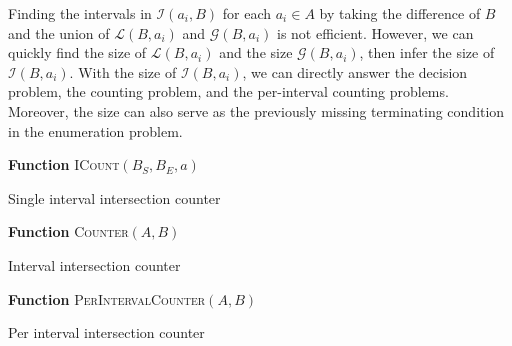 \documentclass{bioinfo}
\begin{document}
	Finding the intervals in $\mathcal{I}(a_i,B)$ for each $a_i\in A$ by
	taking the difference of $B$ and the union of $\mathcal{L}(B,a_i)$ and
	$\mathcal{G}(B,a_i)$ is not efficient.  However, we can quickly find
	the size of $\mathcal{L}(B,a_i)$ and the size $\mathcal{G}(B,a_i)$,
	then infer the size of $\mathcal{I}(B,a_i)$.  With the size of
	$\mathcal{I}(B,a_i)$, we can directly answer the decision problem, the
	counting problem, and the per-interval counting problems.  Moreover,
	the size can also serve as the previously missing terminating
	condition in the enumeration problem.

	\begin{algorithm}[h]
		\DontPrintSemicolon
		\footnotesize
		\BlankLine
		\textbf{Function} \textsc{ICount}$(B_S,B_E,a)$
		\caption{Single interval intersection counter}
	\end{algorithm}

	\begin{algorithm}[h]
		\DontPrintSemicolon
		\footnotesize
		\BlankLine
		\textbf{Function} \textsc{Counter}$(A,B)$
		\caption{Interval intersection counter}
	\end{algorithm}

	\begin{algorithm}[h]
		\DontPrintSemicolon
		\footnotesize
		\BlankLine
		\textbf{Function} \textsc{PerIntervalCounter}$(A,B)$
		\caption{Per interval intersection counter}
	\end{algorithm}
\end{document}
